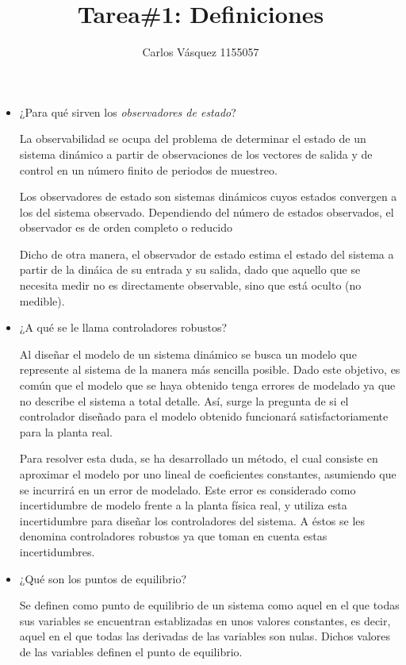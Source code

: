 \documentclass[12pt, letterpaper]{article}
\title{Tarea\#1: Definiciones}
\author{Carlos Vásquez 1155057}
\begin{document}
\maketitle
\begin{itemize}
	\item ¿Para qué sirven los \textit{observadores de estado}?
		
		La observabilidad se ocupa del problema de determinar el estado de un sistema dinámico a partir de observaciones de los vectores de salida y de control en un número finito de periodos de muestreo.

		Los observadores de estado son sistemas dinámicos cuyos estados convergen a los del sistema observado. Dependiendo del número de estados observados, el observador es de orden completo o reducido\autocite{mantz03}

		Dicho de otra manera, el observador de estado estima el estado del sistema a partir de la dináica de su entrada y su salida, dado que aquello que se necesita medir no es directamente observable, sino que está oculto (no medible).

	\item ¿A qué se le llama controladores robustos?

Al diseñar el modelo de un sistema dinámico se busca un modelo que represente al sistema de la manera más sencilla posible. Dado este objetivo, es común que el modelo que se haya obtenido tenga errores de modelado ya que no describe el sistema a total detalle. Así, surge la pregunta de si el controlador diseñado para el modelo obtenido funcionará satisfactoriamente para la planta real.

		Para resolver esta duda, se ha desarrollado un método, el cual consiste en aproximar el modelo por uno lineal de coeficientes constantes, asumiendo que se incurrirá en un error de modelado. Este error es considerado como incertidumbre de modelo frente a la planta física real, y utiliza esta incertidumbre para diseñar los controladores del sistema. A éstos se les denomina controladores robustos ya que toman en cuenta estas incertidumbres.\autocite{inthamoussou11}
	\item ¿Qué son los puntos de equilibrio?

Se definen como punto de equilibrio de un sistema como aquel en el que todas sus variables se encuentran establizadas en unos valores constantes, es decir, aquel en el que todas las derivadas de las variables son nulas. Dichos valores de las variables definen el punto de equilibrio.


\end{itemize}
\end{document}
